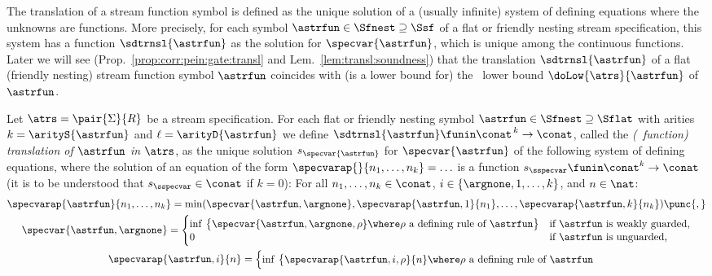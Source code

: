 The translation of a stream function symbol
is defined as the unique solution of a (usually infinite)
system of defining equations where the unknowns are functions.
More precisely, for each symbol $\astrfun \in \Sfnest \supseteq \Ssf$ of a flat
or friendly nesting stream specification,
this system has a \pein{} function
$\sdtrnsl{\astrfun}$ as the solution for $\specvar{\astrfun}$,
which is unique among the continuous functions.
Later we will see 
(Prop.~\ref{prop:corr:pein:gate:transl} and Lem.~\ref{lem:transl:soundness})
that the translation $\sdtrnsl{\astrfun}$ of a flat (friendly nesting)
stream function symbol $\astrfun$ coincides with (is a lower bound for)
the \daob~lower bound $\doLow{\atrs}{\astrfun}$ of $\astrfun$. 
\begin{definition}\normalfont
  \label{def:transl:flat:fn:symbols:pifuncspec}
Let $\atrs = \pair{\Sigma}{R}$ be a stream specification.
For each flat or friendly nesting symbol
  $\astrfun \in \Sfnest \supseteq \Sflat$ with
  arities $k = \arityS{\astrfun}$ and $\ell = \arityD{\astrfun}$
  we define $\sdtrnsl{\astrfun}\funin\conat^{\,k}\to\conat$,
  called the \emph{(\pein~function) translation of\/ $\astrfun$ in $\atrs$}, 
  as the unique solution $s_{\specvar{\astrfun}}$ for $\specvar{\astrfun}$ 
  of the following system of defining equations,
  where the solution of an equation of the form
  $\specvarap{}{n_1,\ldots,n_k} = \ldots$ is a function 
  $s_\sspecvar\funin\conat^{k}\to\conat$
  (it is to be understood that $s_\sspecvar\in\conat$ if $k=0$):
For all $n_1,\ldots,n_k\in\conat$, 
  $i \in \{\argnone,1,\ldots,k\}$, and $n\in\nat$:
\begin{gather*}
    \specvarap{\astrfun}{n_1,\ldots,n_k}
    = \min(
        \specvar{\astrfun,\argnone},
        \specvarap{\astrfun,1}{n_1},
        \ldots,
        \specvarap{\astrfun,k}{n_k}
      )
    \punc{,}
    \\
    \specvar{\astrfun,\argnone}
    = \begin{cases}
        \inf\,
          \big\{
            \specvar{\astrfun,\argnone,\rho}
            \where \text{$\rho$ a defining rule of $\astrfun$}
          \big\}
        & \text{if $\astrfun$ is weakly guarded,} \\[-0.4ex]
        0 & \text{if $\astrfun$ is unguarded,}
      \end{cases}
    \\
    \specvarap{\astrfun,i}{n}
    = \begin{cases}
        \inf\,
          \big\{
            \specvarap{\astrfun,i,\rho}{n}
            \where \text{$\rho$ a defining rule of $\astrfun$}

\end{cases}
\end{gather*}
\end{definition}
